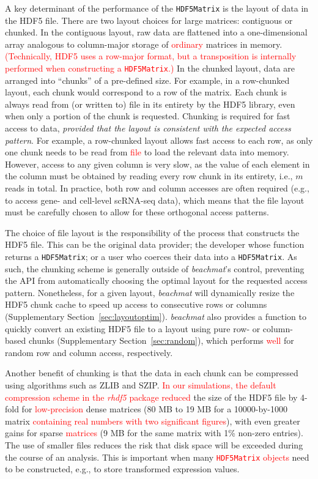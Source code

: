 \documentclass{article}
\newcommand{\beachmat}{\textit{beachmat}}
\newcommand{\code}[1]{\texttt{#1}}
\newcommand{\revised}[1]{\textcolor{red}{#1}}
\begin{document}
A key determinant of the performance of the \code{HDF5Matrix} is the layout of data in the HDF5 file.
There are two layout choices for large matrices: contiguous or chunked.
In the contiguous layout, raw data are flattened into a one-dimensional array analogous to column-major storage of \revised{ordinary} matrices in memory.
\revised{(Technically, HDF5 uses a row-major format, but a transposition is internally performed when constructing a \code{HDF5Matrix}.)}
In the chunked layout, data are arranged into ``chunks'' of a pre-defined size.
For example, in a row-chunked layout, each chunk would correspond to a row of the matrix.
Each chunk is always read from (or written to) file in its entirety by the HDF5 library, even when only a portion of the chunk is requested.
Chunking is required for fast access to data, \textit{provided that the layout is consistent with the expected access pattern}.
For example, a row-chunked layout allows fast access to each row, as only one chunk needs to be read from \revised{file} to load the relevant data into memory.
However, access to any given column is very slow, as the value of each element in the column must be obtained by reading every row chunk in its entirety, i.e., $m$ reads in total.
In practice, both row and column accesses are often required (e.g., to access gene- and cell-level scRNA-seq data), which means that the file layout must be carefully chosen to allow for these orthogonal access patterns.

The choice of file layout is the responsibility of the process that constructs the HDF5 file.
This can be the original data provider; the developer whose function returns a \code{HDF5Matrix}; or a user who coerces their data into a \code{HDF5Matrix}.
As such, the chunking scheme is generally outside of \beachmat{}'s control, preventing the API from automatically choosing the optimal layout for the requested access pattern.
Nonetheless, for a given layout, \beachmat{} will dynamically resize the HDF5 chunk cache to speed up access to consecutive rows or columns (Supplementary Section~\ref{sec:layoutoptim}).
\beachmat{} also provides a function to quickly convert an existing HDF5 file to a layout using pure row- or column-based chunks (Supplementary Section~\ref{sec:random}), which performs \revised{well} for random row and column access, respectively.

Another benefit of chunking is that the data in each chunk can be compressed using algorithms such as ZLIB and SZIP.
\revised{In our simulations, the default compression scheme in the \textit{rhdf5} package reduced} the size of the HDF5 file by 4-fold for \revised{low-precision} dense matrices (80 MB to 19 MB for a 10000-by-1000 matrix \revised{containing real numbers with two significant figures}), with even greater gains for sparse \revised{matrices} (9 MB for the same matrix with 1\% non-zero entries).
The use of smaller files reduces the risk that disk space will be exceeded during the course of an analysis.
This is important when many \revised{\code{HDF5Matrix} objects} need to be constructed, e.g., to store transformed expression values.
\end{document}
